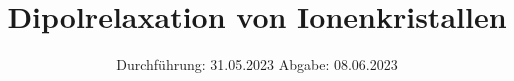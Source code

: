 

\subject{V48}
\title{Dipolrelaxation von Ionenkristallen}
\date{%
  Durchführung: 31.05.2023
  \hspace{3em}
  Abgabe: 08.06.2023
}



\maketitle
\thispagestyle{empty}
\tableofcontents
\newpage
\setcounter{page}{1}



\newpage




\printbibliography{}

